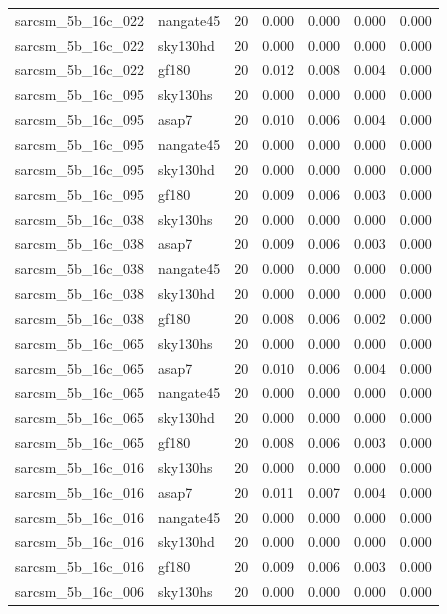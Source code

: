 \begin{tabular}{llrrrrr}
sarcsm\_5b\_16c\_022 & nangate45 & 20 & 0.000 & 0.000 & 0.000 & 0.000 \\
sarcsm\_5b\_16c\_022 & sky130hd & 20 & 0.000 & 0.000 & 0.000 & 0.000 \\
sarcsm\_5b\_16c\_022 & gf180 & 20 & 0.012 & 0.008 & 0.004 & 0.000 \\
sarcsm\_5b\_16c\_095 & sky130hs & 20 & 0.000 & 0.000 & 0.000 & 0.000 \\
sarcsm\_5b\_16c\_095 & asap7 & 20 & 0.010 & 0.006 & 0.004 & 0.000 \\
sarcsm\_5b\_16c\_095 & nangate45 & 20 & 0.000 & 0.000 & 0.000 & 0.000 \\
sarcsm\_5b\_16c\_095 & sky130hd & 20 & 0.000 & 0.000 & 0.000 & 0.000 \\
sarcsm\_5b\_16c\_095 & gf180 & 20 & 0.009 & 0.006 & 0.003 & 0.000 \\
sarcsm\_5b\_16c\_038 & sky130hs & 20 & 0.000 & 0.000 & 0.000 & 0.000 \\
sarcsm\_5b\_16c\_038 & asap7 & 20 & 0.009 & 0.006 & 0.003 & 0.000 \\
sarcsm\_5b\_16c\_038 & nangate45 & 20 & 0.000 & 0.000 & 0.000 & 0.000 \\
sarcsm\_5b\_16c\_038 & sky130hd & 20 & 0.000 & 0.000 & 0.000 & 0.000 \\
sarcsm\_5b\_16c\_038 & gf180 & 20 & 0.008 & 0.006 & 0.002 & 0.000 \\
sarcsm\_5b\_16c\_065 & sky130hs & 20 & 0.000 & 0.000 & 0.000 & 0.000 \\
sarcsm\_5b\_16c\_065 & asap7 & 20 & 0.010 & 0.006 & 0.004 & 0.000 \\
sarcsm\_5b\_16c\_065 & nangate45 & 20 & 0.000 & 0.000 & 0.000 & 0.000 \\
sarcsm\_5b\_16c\_065 & sky130hd & 20 & 0.000 & 0.000 & 0.000 & 0.000 \\
sarcsm\_5b\_16c\_065 & gf180 & 20 & 0.008 & 0.006 & 0.003 & 0.000 \\
sarcsm\_5b\_16c\_016 & sky130hs & 20 & 0.000 & 0.000 & 0.000 & 0.000 \\
sarcsm\_5b\_16c\_016 & asap7 & 20 & 0.011 & 0.007 & 0.004 & 0.000 \\
sarcsm\_5b\_16c\_016 & nangate45 & 20 & 0.000 & 0.000 & 0.000 & 0.000 \\
sarcsm\_5b\_16c\_016 & sky130hd & 20 & 0.000 & 0.000 & 0.000 & 0.000 \\
sarcsm\_5b\_16c\_016 & gf180 & 20 & 0.009 & 0.006 & 0.003 & 0.000 \\
sarcsm\_5b\_16c\_006 & sky130hs & 20 & 0.000 & 0.000 & 0.000 & 0.000 \\

\end{tabular}
